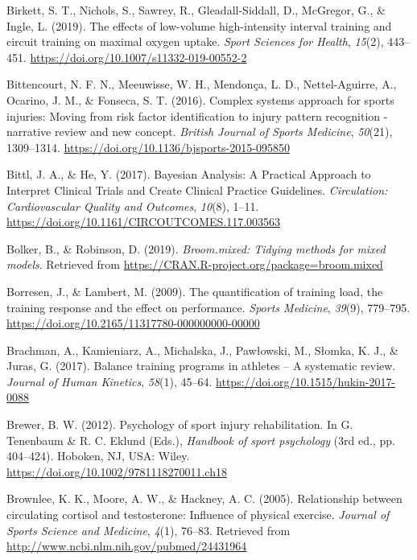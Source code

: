 \documentclass[
  english,
  man,floatsintext]{apa6}
\begin{document}
\leavevmode\hypertarget{ref-Birkett2019}{}%
Birkett, S. T., Nichols, S., Sawrey, R., Gleadall-Siddall, D., McGregor, G., \& Ingle, L. (2019). The effects of low-volume high-intensity interval training and circuit training on maximal oxygen uptake. \emph{Sport Sciences for Health}, \emph{15}(2), 443--451. \url{https://doi.org/10.1007/s11332-019-00552-2}

\leavevmode\hypertarget{ref-Bittencourt2016}{}%
Bittencourt, N. F. N., Meeuwisse, W. H., Mendonça, L. D., Nettel-Aguirre, A., Ocarino, J. M., \& Fonseca, S. T. (2016). Complex systems approach for sports injuries: Moving from risk factor identification to injury pattern recognition - narrative review and new concept. \emph{British Journal of Sports Medicine}, \emph{50}(21), 1309--1314. \url{https://doi.org/10.1136/bjsports-2015-095850}

\leavevmode\hypertarget{ref-Bittl2017}{}%
Bittl, J. A., \& He, Y. (2017). Bayesian Analysis: A Practical Approach to Interpret Clinical Trials and Create Clinical Practice Guidelines. \emph{Circulation: Cardiovascular Quality and Outcomes}, \emph{10}(8), 1--11. \url{https://doi.org/10.1161/CIRCOUTCOMES.117.003563}

\leavevmode\hypertarget{ref-R-broom.mixed}{}%
Bolker, B., \& Robinson, D. (2019). \emph{Broom.mixed: Tidying methods for mixed models}. Retrieved from \url{https://CRAN.R-project.org/package=broom.mixed}

\leavevmode\hypertarget{ref-Borresen2009}{}%
Borresen, J., \& Lambert, M. (2009). The quantification of training load, the training response and the effect on performance. \emph{Sports Medicine}, \emph{39}(9), 779--795. \url{https://doi.org/10.2165/11317780-000000000-00000}

\leavevmode\hypertarget{ref-Brachman2017}{}%
Brachman, A., Kamieniarz, A., Michalska, J., Pawłowski, M., Słomka, K. J., \& Juras, G. (2017). Balance training programs in athletes -- A systematic review. \emph{Journal of Human Kinetics}, \emph{58}(1), 45--64. \url{https://doi.org/10.1515/hukin-2017-0088}

\leavevmode\hypertarget{ref-Brewer2012}{}%
Brewer, B. W. (2012). Psychology of sport injury rehabilitation. In G. Tenenbaum \& R. C. Eklund (Eds.), \emph{Handbook of sport psychology} (3rd ed., pp. 404--424). Hoboken, NJ, USA: Wiley. \url{https://doi.org/10.1002/9781118270011.ch18}

\leavevmode\hypertarget{ref-Brownlee2005}{}%
Brownlee, K. K., Moore, A. W., \& Hackney, A. C. (2005). Relationship between circulating cortisol and testosterone: Influence of physical exercise. \emph{Journal of Sports Science and Medicine}, \emph{4}(1), 76--83. Retrieved from \url{http://www.ncbi.nlm.nih.gov/pubmed/24431964}
\end{document}
